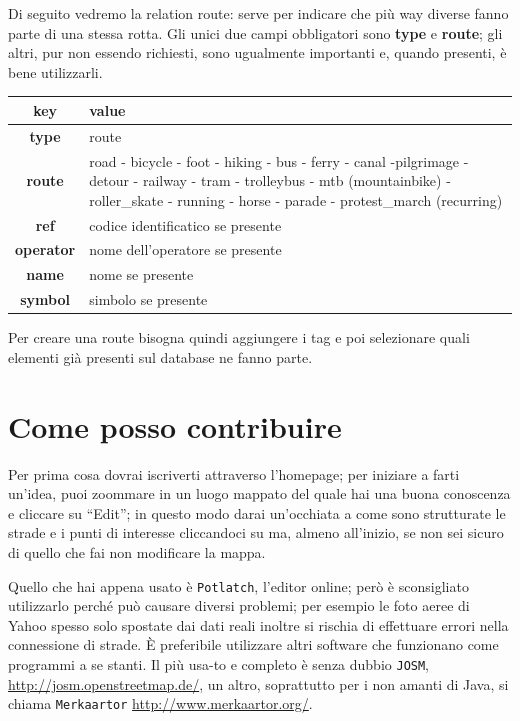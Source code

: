 \documentclass[a4paper,twoside,12pt,]{article}
\newcommand{\key}[1]{\textsf{\textbf{#1}}}
\newcommand{\val}[1]{\textsf{#1}}
\newcommand{\soft}[1]{\texttt{#1}}
\begin{document}
Di seguito vedremo la relation route: serve per indicare che più way diverse fanno parte di una stessa rotta. Gli unici due campi obbligatori sono \key{type} e \key{route}; gli altri, pur non essendo richiesti, sono ugualmente importanti e, quando presenti, è bene utilizzarli.
\begin{center}
 \begin{tabular}{cp{9cm}}
  \toprule
   \textbf{key} & \textbf{value} \\
  \midrule
   \key{type} & \val{route} \\
   \key{route} & \val{road} - \val{bicycle} - \val{foot} - \val{hiking} - \val{bus} - \val{ferry} - \val{canal} -\val{pilgrimage} - \val{detour} - \val{railway} - \val{tram} - \val{trolleybus} - \val{mtb (mountainbike)} - \val{roller\_skate} - \val{running} - \val{horse} - \val{parade} - \val{protest\_march (recurring)} \\
   \key{ref} & \val{codice identificatico se presente}\\
   \key{operator} & \val{nome dell'operatore se presente} \\
   \key{name} & \val{nome se presente} \\
   \key{symbol} & \val{simbolo se presente} \\
  \bottomrule
\end{tabular}
\end{center}
Per creare una route bisogna quindi aggiungere i tag e poi selezionare quali elementi già presenti sul database ne fanno parte.

\section{Come posso contribuire}
Per prima cosa dovrai iscriverti attraverso l'homepage; per iniziare a farti un'idea, puoi zoommare in un luogo mappato del quale hai una buona conoscenza e cliccare su ``Edit''; in questo modo darai un'occhiata a come sono strutturate le strade e i punti di interesse cliccandoci su ma, almeno all'inizio, se non sei sicuro di quello che fai non modificare la mappa.

Quello che hai appena usato è \soft{Potlatch}, l'editor online; però è sconsigliato utilizzarlo perché può causare diversi problemi; per esempio le foto aeree di Yahoo spesso solo spostate dai dati reali inoltre si rischia di effettuare errori nella connessione di strade. È preferibile utilizzare altri software che funzionano come programmi a se stanti. Il più usa-to e completo è senza dubbio \soft{JOSM}, \url{http://josm.openstreetmap.de/}, un altro, soprattutto per i non amanti di Java, si chiama \soft{Merkaartor} \url{http://www.merkaartor.org/}.
\end{document}
